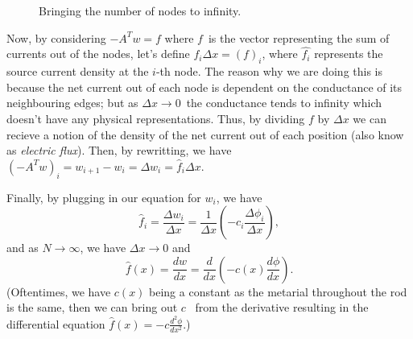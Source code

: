 \documentclass[]{article}
\begin{document}
\begin{figure}
\caption{Bringing the number of nodes to infinity.}
\end{figure}

Now, by considering \(- A^T w = f\) where \(f\)~is the vector
representing the sum of currents out of the nodes, let's define
\(\hat{f_i}\Delta x = (f)_i\), where \(\hat{f_i}\) represents the source
current density at the \(i\)-th node. The reason why we are doing this
is because the net current out of each node is dependent on the
conductance of its neighbouring edges; but as \(\Delta x \to 0\)~the
conductance tends to infinity which doesn't have any physical
representations. Thus, by dividing \(f\) by \(\Delta x\) we can recieve
a notion of the density of the net current out of each position (also
know as \emph{electric flux}). Then, by rewritting, we have
\((- A^T w)_i = w_{i+1} - w_i = \Delta w_i = \hat{f}_i \Delta x\).

Finally, by plugging in our equation for \(w_i\), we have \[
\hat{f}_i = \frac{\Delta w_i}{\Delta x} = \frac{1}{\Delta x}\left(-c_i \frac{\Delta \phi_i}{\Delta x}\right),
\] and as \(N \to \infty\), we have \(\Delta x \to 0\) and \[
\hat{f}(x) = \frac{dw}{dx} = \frac{d}{dx}\left(-c(x) \frac{d\phi}{dx}\right).
\] (Oftentimes, we have \(c(x)\) being a constant as the metarial
throughout the rod is the same, then we can bring out \(c\)~ from the
derivative resulting in the differential equation
\(\hat{f}(x) = -c \frac{d^2 \phi}{dx^2}\).)
\end{document}
